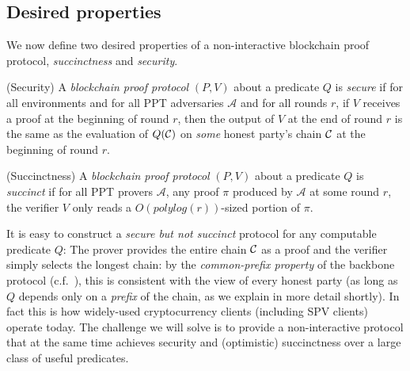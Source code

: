 \subsection{Desired properties}

We now define two desired properties of a non-interactive blockchain proof
protocol, \emph{succinctness} and \emph{security}.

\begin{definition}{(Security)}
A \emph{blockchain proof protocol} $(P, V)$ about a predicate $Q$ is
\emph{secure} if for all environments and for all PPT adversaries
$\mathcal{A}$ and for all rounds $r$, if $V$ receives a proof at the beginning
of round $r$, then the output of $V$ at the end of round $r$ is the same as the
evaluation of $Q(\mathcal{C})$ on \emph{some} honest party's chain $\mathcal{C}$ at the
beginning of round $r$.
\end{definition}

\begin{definition}{(Succinctness)}
A \emph{blockchain proof protocol} $(P, V)$ about a predicate $Q$ is
\emph{succinct} if for all PPT provers $\mathcal{A}$, any proof $\pi$ produced
by $\mathcal{A}$ at some round $r$, the verifier $V$ only reads a
$O(polylog(r))$-sized portion of $\pi$.
\end{definition}

It is easy to construct a \emph{secure but not succinct} protocol for any
computable predicate $Q$: The prover provides the entire chain $\mathcal{C}$ as a
proof and the verifier simply selects the longest chain: by the
\emph{common-prefix property} of the backbone protocol (c.f.~\cite{backbone}),
this is consistent with the view of every honest party (as long as $Q$ depends
only on a \emph{prefix} of the chain, as we explain in more detail shortly). In
fact this is how widely-used cryptocurrency clients (including SPV clients)
operate today.
The challenge we will solve is to provide a non-interactive protocol that at the
same time achieves security and (optimistic) succinctness over a large class of
useful predicates.
